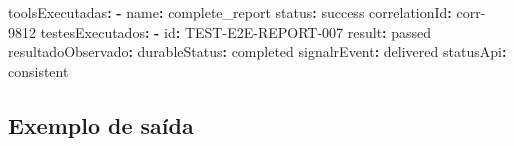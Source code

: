 \documentclass[
  10pt,
  a4paper,
  oneside]{book}
\newenvironment{Shaded}{}{}
\newcommand{\AttributeTok}[1]{\textcolor[rgb]{0.49,0.56,0.16}{#1}}
\newcommand{\FunctionTok}[1]{\textcolor[rgb]{0.02,0.16,0.49}{#1}}
\newcommand{\KeywordTok}[1]{\textcolor[rgb]{0.00,0.44,0.13}{\textbf{#1}}}
\begin{document}
\begin{Shaded}
\begin{Highlighting}[]
\FunctionTok{toolsExecutadas}\KeywordTok{:}
\AttributeTok{  }\KeywordTok{{-}}\AttributeTok{ }\FunctionTok{name}\KeywordTok{:}\AttributeTok{ complete\_report}
\AttributeTok{    }\FunctionTok{status}\KeywordTok{:}\AttributeTok{ success}
\AttributeTok{    }\FunctionTok{correlationId}\KeywordTok{:}\AttributeTok{ corr{-}9812}
\FunctionTok{testesExecutados}\KeywordTok{:}
\AttributeTok{  }\KeywordTok{{-}}\AttributeTok{ }\FunctionTok{id}\KeywordTok{:}\AttributeTok{ TEST{-}E2E{-}REPORT{-}007}
\AttributeTok{    }\FunctionTok{result}\KeywordTok{:}\AttributeTok{ passed}
\FunctionTok{resultadoObservado}\KeywordTok{:}
\AttributeTok{  }\FunctionTok{durableStatus}\KeywordTok{:}\AttributeTok{ completed}
\AttributeTok{  }\FunctionTok{signalrEvent}\KeywordTok{:}\AttributeTok{ delivered}
\AttributeTok{  }\FunctionTok{statusApi}\KeywordTok{:}\AttributeTok{ consistent}
\end{Highlighting}
\end{Shaded}

\hypertarget{exemplo-de-sauxedda}{%
\subsection{Exemplo de saída}\label{exemplo-de-sauxedda}}
\end{document}
